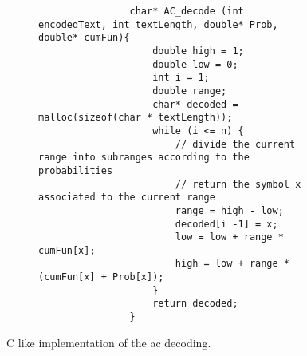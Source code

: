 \documentclass{subfiles}
\begin{document}
    \begin{figure}[!hb]
        \centering
        \begin{subfigure}{0.75\textwidth}
            \begin{lstlisting}
                char* AC_decode (int encodedText, int textLength, double* Prob, double* cumFun){
                    double high = 1;
                    double low = 0;
                    int i = 1;
                    double range;
                    char* decoded = malloc(sizeof(char * textLength));
                    while (i <= n) {
                        // divide the current range into subranges according to the probabilities
                        // return the symbol x associated to the current range 
                        range = high - low;
                        decoded[i -1] = x;
                        low = low + range * cumFun[x];
                        high = low + range * (cumFun[x] + Prob[x]);
                    }
                    return decoded;
                }
            \end{lstlisting}
        \end{subfigure}
        \caption{C like implementation of the \gls{ac} decoding.}
        \label{Fig:5}
    \end{figure}
\end{document}
